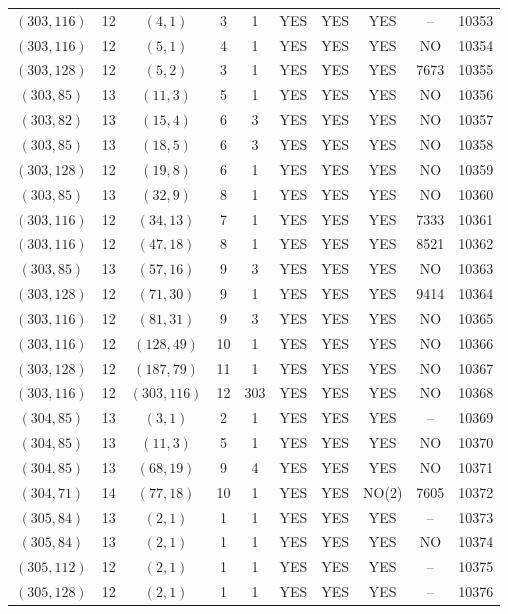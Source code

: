 \begin{longtable}{|c|c|c|c|c|c|c|c|c|c|}
$(303, 116)$ & 12 & $(4, 1)$ & 3 & 1 & YES & YES & YES & -- & 10353\\
$(303, 116)$ & 12 & $(5, 1)$ & 4 & 1 & YES & YES & YES & NO & 10354\\
$(303, 128)$ & 12 & $(5, 2)$ & 3 & 1 & YES & YES & YES & 7673 & 10355\\
$(303, 85)$ & 13 & $(11, 3)$ & 5 & 1 & YES & YES & YES & NO & 10356\\
$(303, 82)$ & 13 & $(15, 4)$ & 6 & 3 & YES & YES & YES & NO & 10357\\
$(303, 85)$ & 13 & $(18, 5)$ & 6 & 3 & YES & YES & YES & NO & 10358\\
$(303, 128)$ & 12 & $(19, 8)$ & 6 & 1 & YES & YES & YES & NO & 10359\\
$(303, 85)$ & 13 & $(32, 9)$ & 8 & 1 & YES & YES & YES & NO & 10360\\
$(303, 116)$ & 12 & $(34, 13)$ & 7 & 1 & YES & YES & YES & 7333 & 10361\\
$(303, 116)$ & 12 & $(47, 18)$ & 8 & 1 & YES & YES & YES & 8521 & 10362\\
$(303, 85)$ & 13 & $(57, 16)$ & 9 & 3 & YES & YES & YES & NO & 10363\\
$(303, 128)$ & 12 & $(71, 30)$ & 9 & 1 & YES & YES & YES & 9414 & 10364\\
$(303, 116)$ & 12 & $(81, 31)$ & 9 & 3 & YES & YES & YES & NO & 10365\\
$(303, 116)$ & 12 & $(128, 49)$ & 10 & 1 & YES & YES & YES & NO & 10366\\
$(303, 128)$ & 12 & $(187, 79)$ & 11 & 1 & YES & YES & YES & NO & 10367\\
$(303, 116)$ & 12 & $(303, 116)$ & 12 & 303 & YES & YES & YES & NO & 10368\\
$(304, 85)$ & 13 & $(3, 1)$ & 2 & 1 & YES & YES & YES & -- & 10369\\
$(304, 85)$ & 13 & $(11, 3)$ & 5 & 1 & YES & YES & YES & NO & 10370\\
$(304, 85)$ & 13 & $(68, 19)$ & 9 & 4 & YES & YES & YES & NO & 10371\\
$(304, 71)$ & 14 & $(77, 18)$ & 10 & 1 & YES & YES & NO(2) & 7605 & 10372\\
$(305, 84)$ & 13 & $(2, 1)$ & 1 & 1 & YES & YES & YES & -- & 10373\\
$(305, 84)$ & 13 & $(2, 1)$ & 1 & 1 & YES & YES & YES & NO & 10374\\
$(305, 112)$ & 12 & $(2, 1)$ & 1 & 1 & YES & YES & YES & -- & 10375\\
$(305, 128)$ & 12 & $(2, 1)$ & 1 & 1 & YES & YES & YES & -- & 10376\\

\end{longtable}
